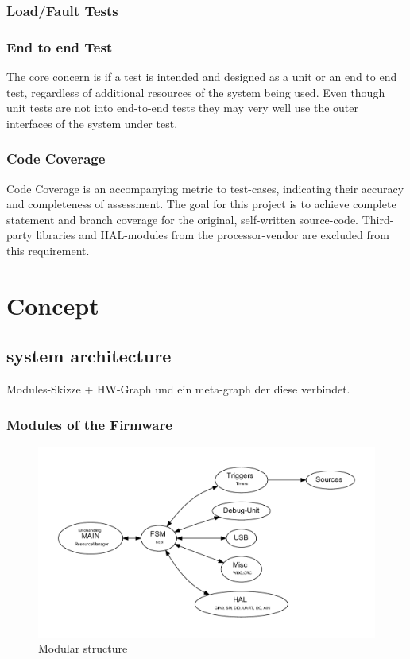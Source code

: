 \documentclass[master,english,smartquotes,apa]{hgbthesis}
\begin{document}
			\subsection{Load/Fault Tests}
			
			\subsection{End to end Test}
			The core concern is if a test is intended and designed as a unit or an end to end test, regardless of additional resources of the system being used.
			Even though unit tests are not into end-to-end tests they may very well use the outer interfaces of the system under test.

			\subsection{Code Coverage}
			Code Coverage is an accompanying metric to test-cases, indicating their accuracy and completeness of assessment. The goal for this project is to achieve complete statement and branch coverage for the original, self-written source-code. Third-party libraries and HAL-modules from the processor-vendor are excluded from this requirement.
			
	\chapter{Concept}
	\label{cha:Concept}
		\section{ system architecture }
			Modules-Skizze + HW-Graph und ein meta-graph der diese verbindet.
		\subsection{Modules of the Firmware}
		\begin{figure}[H]
			\center
			\includegraphics[width=\textwidth]{src/_FW-Modules.pdf}
			\caption{Modular structure}
			\label{fig:_FW-Modules}
		\end{figure}
\end{document}
